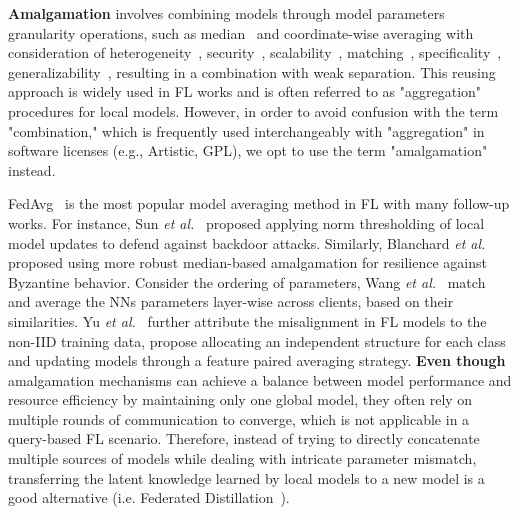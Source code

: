 \textbf{Amalgamation} involves combining models through model parameters granularity operations, such as median~\cite{blanchard2017machine, pillutla2022robust} and coordinate-wise averaging with consideration of heterogeneity~\cite{mcmahan2017communication, li2018federated}, security~\cite{sun2019can}, scalability~\cite{reisizadeh2020fedpaq}, matching~\cite{wang2020federated, yu2021fed2}, specificality~\cite{gudur2020resource}, generalizability~\cite{qu2022generalized}, resulting in a combination with weak separation.
This reusing approach is widely used in FL works and is often referred to as "aggregation" procedures for local models.
However, in order to avoid confusion with the term "combination," which is frequently used interchangeably with "aggregation" in software licenses (e.g., Artistic, GPL), we opt to use the term "amalgamation" instead.

FedAvg~\cite{mcmahan2017communication} is the most popular model averaging method in FL with many follow-up works. 
For instance, Sun \textit{et al.}~\cite{sun2019can} proposed applying norm thresholding of local model updates to defend against backdoor attacks.
Similarly, Blanchard \textit{et al.}~\cite{blanchard2017machine} proposed using more robust median-based amalgamation for resilience against Byzantine behavior.
Consider the ordering of parameters, Wang \textit{et al.}~\cite{wang2020federated} match and average the NNs parameters layer-wise across clients, based on their similarities.
Yu \textit{et al.}~\cite{yu2021fed2} further attribute the misalignment in FL models to the non-IID training data, propose allocating an independent structure for each class and updating models through a feature paired averaging strategy.
\textbf{Even though} amalgamation mechanisms can achieve a balance between model performance and resource efficiency by maintaining only one global model, they often rely on multiple rounds of communication to converge, which is not applicable in a query-based FL scenario.
Therefore, instead of trying to directly concatenate multiple sources of models while dealing with intricate parameter mismatch, transferring the latent knowledge learned by local models to a new model is a good alternative (i.e. Federated Distillation~\cite{jeong2018communication, jin2023feddyn}).

